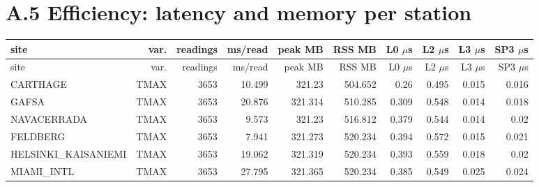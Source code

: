 \documentclass[10pt,a4paper]{article}
\begin{document}
\section*{A.5 Efficiency: latency and memory per station}
{\small
\setlength{\tabcolsep}{3pt}
\setlength{\LTleft}{\fill}
\setlength{\LTright}{\fill}
\begin{longtable}{lrrrrrrrrr}
\toprule
site & var. & readings & ms/\allowbreak{}read & peak MB & RSS MB & L0 $\mu$s & L2 $\mu$s & L3 $\mu$s & SP3 $\mu$s \\
\midrule
\endfirsthead
\toprule
site & var. & readings & ms/\allowbreak{}read & peak MB & RSS MB & L0 $\mu$s & L2 $\mu$s & L3 $\mu$s & SP3 $\mu$s \\
\midrule
\endhead
\bottomrule
\endlastfoot
CARTHAGE & TMAX & 3653 & 10.499 & 321.23 & 504.652 & 0.26 & 0.495 & 0.015 & 0.016 \\
GAFSA & TMAX & 3653 & 20.876 & 321.314 & 510.285 & 0.309 & 0.548 & 0.014 & 0.018 \\
NAVACERRADA & TMAX & 3653 & 9.573 & 321.23 & 516.812 & 0.379 & 0.544 & 0.014 & 0.02 \\
FELDBERG & TMAX & 3653 & 7.941 & 321.273 & 520.234 & 0.394 & 0.572 & 0.015 & 0.021 \\
HELSINKI\_\allowbreak{}KAISANIEMI & TMAX & 3653 & 19.062 & 321.319 & 520.234 & 0.393 & 0.559 & 0.018 & 0.02 \\
MIAMI\_\allowbreak{}INTL & TMAX & 3653 & 27.795 & 321.365 & 520.234 & 0.385 & 0.549 & 0.025 & 0.024 \\
\end{longtable}
}
\end{document}
